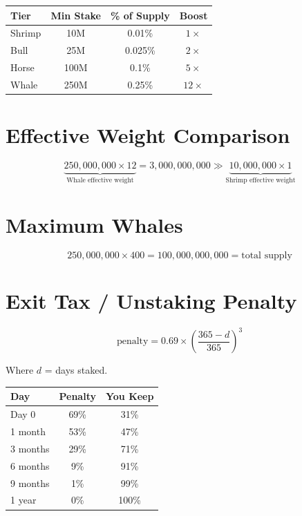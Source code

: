 \documentclass{article}
\begin{document}
\begin{center}
\begin{tabular}{|l|c|c|c|}
\hline
\textbf{Tier} & \textbf{Min Stake} & \textbf{\% of Supply} & \textbf{Boost} \\
\hline
Shrimp & 10M   & 0.01\%  & $1\times$  \\
\hline
Bull   & 25M   & 0.025\% & $2\times$  \\
\hline
Horse  & 100M  & 0.1\%   & $5\times$  \\
\hline
Whale  & 250M  & 0.25\%  & $12\times$ \\
\hline
\end{tabular}
\end{center}

\section*{Effective Weight Comparison}

\[
\underbrace{250{,}000{,}000 \times 12}_{\text{Whale effective weight}}
= 3{,}000{,}000{,}000
\gg
\underbrace{10{,}000{,}000 \times 1}_{\text{Shrimp effective weight}}
\]

\section*{Maximum Whales}

\[
250{,}000{,}000 \times 400 = 100{,}000{,}000{,}000 = \text{total supply}
\]

\section*{Exit Tax / Unstaking Penalty}

\[
\text{penalty} = 0.69 \times \left(\frac{365 - d}{365}\right)^3
\]

Where $d$ = days staked.

\begin{center}
\begin{tabular}{|l|c|c|}
\hline
\textbf{Day} & \textbf{Penalty} & \textbf{You Keep} \\
\hline
Day 0    & 69\% & 31\%  \\
\hline
1 month  & 53\% & 47\%  \\
\hline
3 months & 29\% & 71\%  \\
\hline
6 months &  9\% & 91\%  \\
\hline
9 months &  1\% & 99\%  \\
\hline
1 year   &  0\% & 100\% \\
\hline
\end{tabular}
\end{center}
\end{document}
